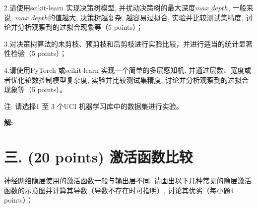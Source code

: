 \documentclass[8pt]{article}
\begin{document}
2.请使用scikit-learn 实现决策树模型, 并扰动决策树的最大深度$max\_ depth$, 一般来说, $max\_ depth$的值越大, 决策树越复杂, 越容易过拟合, 实验并比较测试集精度, 讨论并分析观察到的过拟合现象等（5 points）；

3.对决策树算法的未剪枝、预剪枝和后剪枝进行实验比较，并进行适当的统计显著性检验（5 points）；

4.请使用PyTorch 或scikit-learn 实现一个简单的多层感知机, 并通过层数、宽度或者优化轮数控制模型复杂度, 实验并比较测试集精度, 讨论并分析观察到的过拟合现象等（5 points）。

注: 请选择1 至 3 个UCI 机器学习库中的数据集进行实验。

\textbf{\large 解:}

\vspace{3em}

\section*{三. (20 points) 激活函数比较}
神经网络隐层使用的激活函数一般与输出层不同. 请画出以下几种常见的隐层激活函数的示意图并计算其导数（导数不存在时可指明）, 讨论其优劣（每小题4 points）：
\end{document}
